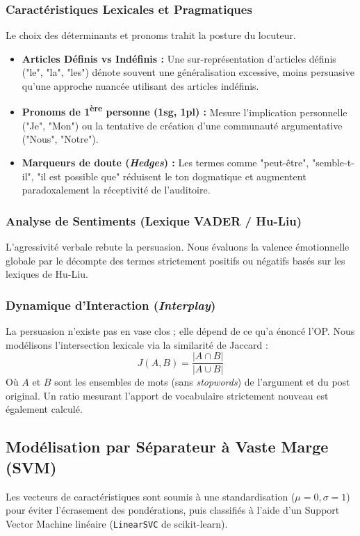 \documentclass[11pt,a4paper]{article}
\begin{document}
\subsubsection{Caractéristiques Lexicales et Pragmatiques}
Le choix des déterminants et pronoms trahit la posture du locuteur.
\begin{itemize}
    \item \textbf{Articles Définis vs Indéfinis :} Une sur-représentation d'articles définis ("le", "la", "les") dénote souvent une généralisation excessive, moins persuasive qu'une approche nuancée utilisant des articles indéfinis.
    \item \textbf{Pronoms de 1\textsuperscript{ère} personne (1sg, 1pl) :} Mesure l'implication personnelle ("Je", "Mon") ou la tentative de création d'une communauté argumentative ("Nous", "Notre").
    \item \textbf{Marqueurs de doute (\textit{Hedges}) :} Les termes comme "peut-être", "semble-t-il", "il est possible que" réduisent le ton dogmatique et augmentent paradoxalement la réceptivité de l'auditoire.
\end{itemize}

\subsubsection{Analyse de Sentiments (Lexique VADER / Hu-Liu)}
L'agressivité verbale rebute la persuasion. Nous évaluons la valence émotionnelle globale par le décompte des termes strictement positifs ou négatifs basés sur les lexiques de Hu-Liu.

\subsubsection{Dynamique d'Interaction (\textit{Interplay})}
La persuasion n'existe pas en vase clos ; elle dépend de ce qu'a énoncé l'OP. Nous modélisons l'intersection lexicale via la similarité de Jaccard :
\begin{equation}
    J(A, B) = \frac{|A \cap B|}{|A \cup B|}
\end{equation}
Où $A$ et $B$ sont les ensembles de mots (sans \textit{stopwords}) de l'argument et du post original. Un ratio mesurant l'apport de vocabulaire strictement nouveau est également calculé.

\subsection{Modélisation par Séparateur à Vaste Marge (SVM)}
Les vecteurs de caractéristiques sont soumis à une standardisation ($\mu=0, \sigma=1$) pour éviter l'écrasement des pondérations, puis classifiés à l'aide d'un Support Vector Machine linéaire (\texttt{LinearSVC} de scikit-learn). 
\end{document}
